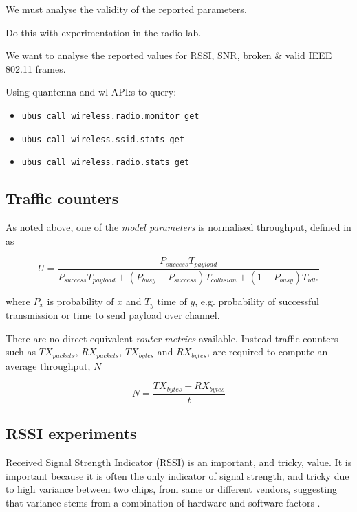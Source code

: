 We must analyse the validity of the reported parameters.

Do this with experimentation in the radio lab.

We want to analyse the reported values for RSSI, SNR, broken \& valid IEEE
802.11 frames.

Using quantenna and wl API:s to query:
\begin{itemize}
    \item \texttt{ubus call wireless.radio.monitor get}
    \item \texttt{ubus call wireless.ssid.stats get}
    \item \texttt{ubus call wireless.radio.stats get}
\end{itemize}

\subsection{Traffic counters}

As noted above, one of the \emph{model parameters} is normalised throughput,
defined in \cite{felemban} as

\begin{equation}
U = \frac{P_{success}T_{payload}}{P_{success}T_{payload} + (P_{busy} -
P_{success})T_{collision} + (1 - P_{busy})T_{idle}}
\end{equation}

where $P_x$ is probability of $x$ and $T_y$ time of $y$, e.g. probability of successful transmission or time to send payload over channel.

There are no direct equivalent \emph{router metrics} available. Instead traffic counters such as $TX_{packets}$,
$RX_{packets}$, $TX_{bytes}$ and $RX_{bytes}$, are required to compute an average throughput, $N$

\begin{equation}
N = \frac{TX_{bytes} + RX_{bytes}}{t}
\end{equation}

\subsection{RSSI experiments}

Received Signal Strength Indicator (RSSI) is an important, and tricky, value. It
is important because it is often the only indicator of signal strength, and
tricky due to high variance between two chips, from same or different vendors,
suggesting that variance stems from a combination of hardware and software
factors \cite{lui}.

